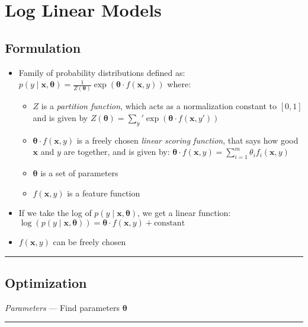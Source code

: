 \section{Log Linear Models}
\subsection*{Formulation}
\begin{itemize}
    \item Family of probability distributions defined as:
    $p(y \mid \boldsymbol{x}, \boldsymbol{\theta}) = \frac{1}{Z(\boldsymbol{\theta})} \exp(\boldsymbol{\theta} \cdot f(\boldsymbol{x}, y))$ where:
    \begin{itemize}
        \item $Z$ is a \emph{partition function}, which acts as a normalization constant to $[0,1]$ and is given by
        $Z(\boldsymbol{\theta}) = \sum_y' \exp(\boldsymbol{\theta} \cdot f(\boldsymbol{x}, y'))$
        \item $\boldsymbol{\theta} \cdot f(\boldsymbol{x}, y)$ is a freely chosen \emph{linear scoring function}, that says how good $\boldsymbol{x}$ and $y$ are together, and is given by:
        $\boldsymbol{\theta} \cdot f(\boldsymbol{x}, y) = \sum_{i=1}^m \theta_i f_i(\boldsymbol{x}, y)$
        \item $\boldsymbol{\theta}$ is a set of parameters
        \item $f(\boldsymbol{x}, y)$ is a feature function
    \end{itemize}
    \item If we take the log of $p(y \mid \boldsymbol{x}, \boldsymbol{\theta})$, we get a linear function: $\log\left(p(y \mid \boldsymbol{x}, \boldsymbol{\theta})\right) = \boldsymbol{\theta} \cdot f(\boldsymbol{x}, y) + \textrm{constant}$
    \item $f(\boldsymbol{x}, y)$ can be freely chosen
\end{itemize}

{\color{black}\hrule height 0.001mm}

\subsection*{Optimization}
\emph{Parameters} --- Find parameters $\boldsymbol{\theta}$

{\color{lightgray}\hrule height 0.001mm}

